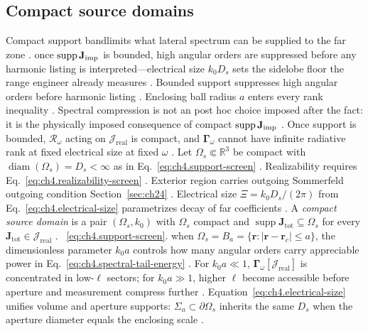 \subsection{Compact source domains}
\label{sec:ch431}
Compact support bandlimits what lateral spectrum can be supplied to the far zone \cite{jackson1999}.
once $\operatorname{supp}\mathbf{J}_{\mathrm{imp}}$ is bounded, high angular orders are suppressed before any harmonic listing is interpreted---electrical size $k_0 D_s$ sets the sidelobe floor the range engineer already measures \cite{jackson1999}.
Bounded support suppresses high angular orders before harmonic listing \cite{jackson1999}. Enclosing ball radius $a$ enters every rank inequality \cite{chu1948}.
\medskip
Spectral compression is not an post hoc choice imposed after the fact: it is the physically imposed
consequence of compact \(\operatorname{supp}\mathbf{J}_{\mathrm{imp}}\) \cite{stratton1941}. Once
support is bounded, \(\mathcal{R}_\omega\) acting on \(\mathcal{J}_{\mathrm{real}}\) is compact, and
\(\boldsymbol{\Gamma}_\omega\) cannot have infinite radiative rank at fixed electrical size at fixed \(\omega\) \cite{hansen1988}.
Let \(\Omega_{s}\Subset\mathbb{R}^{3}\) be compact with \(\operatorname{diam}(\Omega_{s})=D_{s}<\infty\) as in
Eq.~\eqref{eq:ch4.support-screen} \cite{stratton1941}. Realizability requires Eq.~\eqref{eq:ch4.realizability-screen} \cite{harrington2001}. Exterior
region carries outgoing Sommerfeld outgoing condition Section~\ref{sec:ch24} \cite{stratton1941}. Electrical size
\(\Xi=k_{0}D_{s}/(2\pi)\) from Eq.~\eqref{eq:ch4.electrical-size} parametrizes decay of far coefficients
\cite{jackson1999}.
\label{def:ch4.compact-source-domain}
A \emph{compact source domain} is a pair \((\Omega_{s},k_{0})\) with \(\Omega_{s}\) compact and
\(\operatorname{supp}\mathbf{J}_{\mathrm{tot}}\subseteq\Omega_{s}\) for every
\(\mathbf{J}_{\mathrm{tot}}\in\mathcal{J}_{\mathrm{real}}\) \cite{stratton1941}. ~\eqref{eq:ch4.support-screen}.
when \(\Omega_{s}=B_{a}=\{\mathbf{r}:|\mathbf{r}-\mathbf{r}_{c}|\le a\}\), the dimensionless parameter
\(k_{0}a\) controls how many angular orders carry appreciable power in Eq.~\eqref{eq:ch4.spectral-tail-energy}
\cite{stratton1941}. For \(k_{0}a\ll1\), \(\boldsymbol{\Gamma}_\omega[\mathcal{J}_{\mathrm{real}}]\) is
concentrated in low-\(\ell\) sectors; for \(k_{0}a\gg1\), higher \(\ell\) become accessible before aperture and
measurement compress further \cite{hansen1988}. Equation~\eqref{eq:ch4.electrical-size} unifies
volume and aperture supports: \(\Sigma_{a}\subset\partial\Omega_{s}\) inherits the same \(D_{s}\) when the
aperture diameter equals the enclosing scale \cite{collin2001}.
